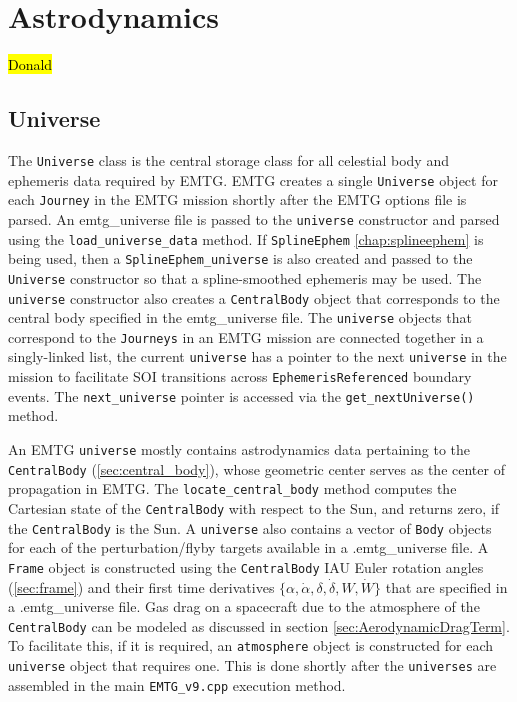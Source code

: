 \chapter{Astrodynamics}
\label{chap:astrodynamics}

\hl{Donald}

\section{Universe}
\label{sec:universe}

The \texttt{Universe} class is the central storage class for all celestial body and ephemeris data required by EMTG. EMTG creates a single \texttt{Universe} object for each \texttt{Journey} in the EMTG mission shortly after the EMTG options file is parsed. An emtg\_universe file is passed to the \texttt{universe} constructor and parsed using the \texttt{load\_universe\_data} method. If \texttt{SplineEphem} \ref{chap:splineephem} is being used, then a \texttt{SplineEphem\_universe} is also created and passed to the \texttt{Universe} constructor so that a spline-smoothed ephemeris may be used. The \texttt{universe} constructor also creates a \texttt{CentralBody} object that corresponds to the central body specified in the emtg\_universe file. The \texttt{universe} objects that correspond to the \texttt{Journeys} in an EMTG mission are connected together in a singly-linked list, the current \texttt{universe} has a pointer to the next \texttt{universe} in the mission to facilitate SOI transitions across \texttt{EphemerisReferenced} boundary events. The \texttt{next\_universe} pointer is accessed via the \texttt{get\_nextUniverse()} method.

An EMTG \texttt{universe} mostly contains astrodynamics data pertaining to the \texttt{CentralBody} (\ref{sec:central_body}), whose geometric center serves as the center of propagation in EMTG. The \texttt{locate\_central\_body} method computes the Cartesian state of the \texttt{CentralBody} with respect to the Sun, and returns zero, if the \texttt{CentralBody} is the Sun. A \texttt{universe} also contains a vector of \texttt{Body} objects for each of the perturbation/flyby targets available in a .emtg\_universe file. A \texttt{Frame} object is constructed using the \texttt{CentralBody} IAU Euler rotation angles (\ref{sec:frame}) and their first time derivatives $\{\alpha, \dot{\alpha}, \delta, \dot{\delta}, W, \dot{W}\}$ that are specified in a .emtg\_universe file. Gas drag on a spacecraft due to the atmosphere of the \texttt{CentralBody} can be modeled as discussed in section \ref{sec:AerodynamicDragTerm}. To facilitate this, if it is required, an \texttt{atmosphere} object is constructed for each \texttt{universe} object that requires one. This is done shortly after the \texttt{universes} are assembled in the main \texttt{EMTG\_v9.cpp} execution method.

